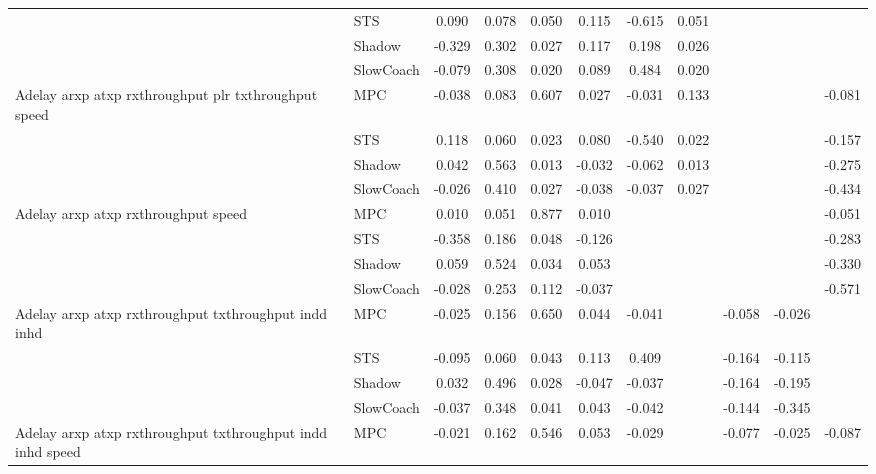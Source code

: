 \begin{tabular}{|l|l|*{9}{c|}}
                              & STS &    0.090 &     0.078 &     0.050 &  0.115 & -0.615 &  0.051 &      &      &       \\
                              & Shadow &   -0.329 &     0.302 &     0.027 &  0.117 &  0.198 &  0.026 &      &      &       \\
                              & SlowCoach &   -0.079 &     0.308 &     0.020 &  0.089 &  0.484 &  0.020 &      &      &       \\
\midrule
Adelay arxp atxp rxthroughput plr txthroughput speed    & MPC &   -0.038 &     0.083 &     0.607 &  0.027 & -0.031 &  0.133 &      &      &   -0.081 \\
                              & STS &    0.118 &     0.060 &     0.023 &  0.080 & -0.540 &  0.022 &      &      &   -0.157 \\
                              & Shadow &    0.042 &     0.563 &     0.013 & -0.032 & -0.062 &  0.013 &      &      &   -0.275 \\
                              & SlowCoach &   -0.026 &     0.410 &     0.027 & -0.038 & -0.037 &  0.027 &      &      &   -0.434 \\
\midrule
Adelay arxp atxp rxthroughput speed    & MPC &    0.010 &     0.051 &     0.877 &  0.010 &     &     &      &      &   -0.051 \\
                              & STS &   -0.358 &     0.186 &     0.048 & -0.126 &     &     &      &      &   -0.283 \\
                              & Shadow &    0.059 &     0.524 &     0.034 &  0.053 &     &     &      &      &   -0.330 \\
                              & SlowCoach &   -0.028 &     0.253 &     0.112 & -0.037 &     &     &      &      &   -0.571 \\
\midrule
Adelay arxp atxp rxthroughput txthroughput indd inhd    & MPC &   -0.025 &     0.156 &     0.650 &  0.044 & -0.041 &     &  -0.058 &  -0.026 &       \\
                              & STS &   -0.095 &     0.060 &     0.043 &  0.113 &  0.409 &     &  -0.164 &  -0.115 &       \\
                              & Shadow &    0.032 &     0.496 &     0.028 & -0.047 & -0.037 &     &  -0.164 &  -0.195 &       \\
                              & SlowCoach &   -0.037 &     0.348 &     0.041 &  0.043 & -0.042 &     &  -0.144 &  -0.345 &       \\
\midrule
Adelay arxp atxp rxthroughput txthroughput indd inhd speed    & MPC &   -0.021 &     0.162 &     0.546 &  0.053 & -0.029 &     &  -0.077 &  -0.025 &   -0.087 \\

\end{tabular}
